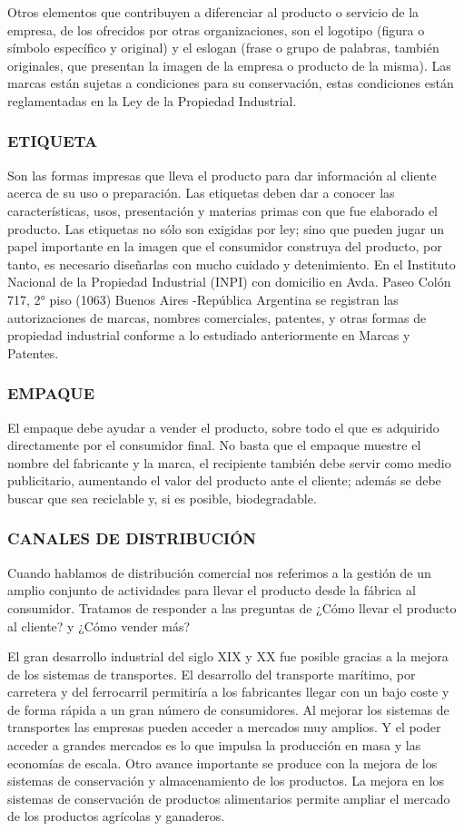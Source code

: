 Otros elementos que contribuyen a diferenciar al producto o servicio de la empresa, de los ofrecidos por otras organizaciones, son el logotipo (figura o símbolo específico y original) y el eslogan (frase o grupo de palabras, también originales, que presentan la imagen de la empresa o producto de la misma). Las marcas están sujetas a condiciones para su conservación, estas condiciones están reglamentadas en la Ley de la Propiedad Industrial.

\subsubsection*{ETIQUETA}
Son las formas impresas que lleva el producto para dar información al cliente acerca de su uso o preparación. Las etiquetas deben dar a conocer las características, usos, presentación y materias primas con que fue elaborado el producto. Las etiquetas no sólo son exigidas por ley; sino que pueden jugar un papel importante en la imagen que el consumidor construya del producto, por tanto, es necesario diseñarlas con mucho cuidado y detenimiento. En el Instituto Nacional de la Propiedad Industrial (INPI) con domicilio en Avda. Paseo Colón 717, 2° piso (1063) Buenos Aires -República Argentina se registran las autorizaciones de marcas, nombres comerciales, patentes, y otras formas de propiedad industrial conforme a lo estudiado anteriormente en Marcas y Patentes.

\subsubsection*{EMPAQUE}
El empaque debe ayudar a vender el producto, sobre todo el que es adquirido directamente por el consumidor final. No basta que el empaque muestre el nombre del fabricante y la marca, el recipiente también debe servir como medio publicitario, aumentando el valor del producto ante el cliente; además se debe buscar que sea reciclable y, si es posible, biodegradable.

\subsubsection*{CANALES DE DISTRIBUCIÓN}
Cuando hablamos de distribución comercial nos referimos a la gestión de un amplio conjunto de actividades para llevar el producto desde la fábrica al consumidor. Tratamos de responder a las preguntas de ¿Cómo llevar el producto al cliente? y ¿Cómo vender más?

El gran desarrollo industrial del siglo XIX y XX fue posible gracias a la mejora de los sistemas de transportes. El desarrollo del transporte marítimo, por carretera y del ferrocarril permitiría a los fabricantes llegar con un bajo coste y de forma rápida a un gran número de consumidores. Al mejorar los sistemas de transportes las empresas pueden acceder a mercados muy amplios. Y el poder acceder a grandes mercados es lo que impulsa la producción en masa y las economías de escala. Otro avance importante se produce con la mejora de los sistemas de conservación y almacenamiento de los productos. La mejora en los sistemas de conservación de productos alimentarios permite ampliar el mercado de los productos agrícolas y ganaderos.

